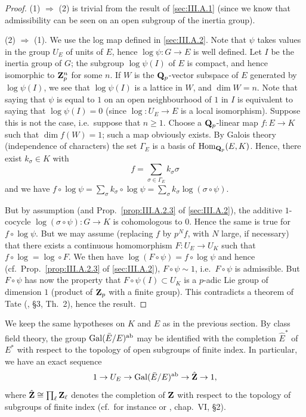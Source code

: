 \begin{proof}
(1) $\Rightarrow$ (2) is trivial from the result of \ref{sec:III.A.1}
(since we know that admissibility can be seen on an open subgroup of
the inertia group).

(2) $\Rightarrow$ (1).  We use the log map defined in
\ref{sec:III.A.2}.  Note that $\psi$ takes values in the group $U_E$ of
units of $E$, hence $\log\psi\colon G\to E$ is well defined.  Let $I$
be the inertia group of $G$; the subgroup $\log\psi(I)$ of $E$ is
compact, and hence isomorphic to $\mathbf{Z}_p^n$ for some $n$.  If $W$ is the
$\mathbf{Q}_p$-vector subspace of $E$ generated by $\log\psi(I)$, we see that
$\log\psi(I)$ is a lattice in $W$, and $\dim W=n$.  Note that saying
that $\psi$ is equal to $1$ on an open neighbourhood of $1$ in $I$ is
equivalent to saying that $\log\psi(I)=0$ (since
$\log\colon U_E\to E$ is a local isomorphism).  Suppose this is not the
case, i.e.\ suppose that $n\geq 1$.  Choose a $\mathbf{Q}_p$-linear map
$f\colon E\to K$ such that $\dim f(W)=1$; such a map obviously exists.
By Galois theory (independence of characters) the set $\Gamma_E$ is a
basis of $\mathrm{Hom}_{\mathbf{Q}_p}(E,K)$.  Hence, there exist $k_\sigma\in K$ with
\[
f=\sum_{\sigma\in\Gamma_E} k_\sigma\sigma
\]
and we have $f\circ\log\psi = \sum_\sigma k_\sigma\circ\log\psi
= \sum_\sigma k_\sigma\log(\sigma\circ\psi)$.

But by assumption (and Prop.~\ref{prop:III.A.2.3} of
\ref{sec:III.A.2}), the additive $1$-cocycle
$\log(\sigma\circ\psi)\colon G\to K$ is cohomologous to $0$.  Hence the
same is true for $f\circ\log\psi$.  But we may assume (replacing $f$ by
$p^Nf$, with $N$ large, if necessary) that there exists a continuous
homomorphism $F\colon U_E\to U_K$ such that $f\circ\log=\log\circ F$.
We then have $\log(F\circ\psi)=f\circ\log\psi$ and hence
(cf.~Prop.~\ref{prop:III.A.2.3} of \ref{sec:III.A.2}), $F\circ\psi\sim
1$, i.e.\ $F\circ\psi$ is admissible.  But $F\circ\psi$ has now the
property that $F\circ\psi(I)\subset U_K$ is a $p$-adic Lie group of
dimension $1$ (product of $\mathbf{Z}_p$ with a finite group).  This
contradicts a theorem of Tate (\cite{tate-pdiv}, \S3, Th.~2), hence the
result.
\end{proof}


We keep the same hypotheses on $K$ and $E$ as in the previous section.
By class field theory, the group $\mathrm{Gal}(\bar E/E)^{\mathrm{ab}}$ may be
identified with the completion $\hat E^*$ of $E^*$ with respect to the
topology of open subgroups of finite index.  In particular, we have an
exact sequence
\[
1\to U_E \to \mathrm{Gal}(\bar E/E)^{\mathrm{ab}} \to \hat{\mathbf{Z}} \to 1,
\]
where $\hat{\mathbf{Z}}\cong\prod_\ell \mathbf{Z}_\ell$ denotes the completion of $\mathbf{Z}$
with respect to the topology of subgroups of finite index (cf.\ for
instance \cite{artin-tate-cft} or \cite{cassels-frohlich}, chap.~VI,
\S2).

